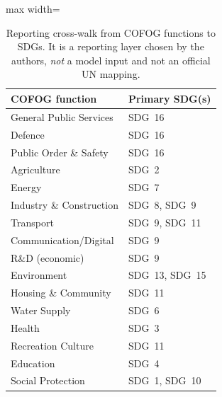 \begin{table}[H]
\caption{Reporting cross-walk from COFOG functions to SDGs. It is a reporting layer chosen by the authors, \emph{not} a model input and not an official UN mapping.}\label{tab:sdg}
\centering\footnotesize
\renewcommand{\arraystretch}{1.0}
\begin{adjustbox}{max width=\linewidth}
\begin{tabular}{ll}
\toprule
COFOG function & Primary SDG(s) \\
\midrule
General Public Services & SDG~16 \\
Defence & SDG~16 \\
Public Order \& Safety & SDG~16 \\
Agriculture & SDG~2 \\
Energy & SDG~7 \\
Industry \& Construction & SDG~8, SDG~9 \\
Transport & SDG~9, SDG~11 \\
Communication/Digital & SDG~9 \\
R\&D (economic) & SDG~9 \\
Environment & SDG~13, SDG~15 \\
Housing \& Community & SDG~11 \\
Water Supply & SDG~6 \\
Health & SDG~3 \\
Recreation Culture & SDG~11 \\
Education & SDG~4 \\
Social Protection & SDG~1, SDG~10 \\
\bottomrule
\end{tabular}\end{adjustbox}
\end{table}
